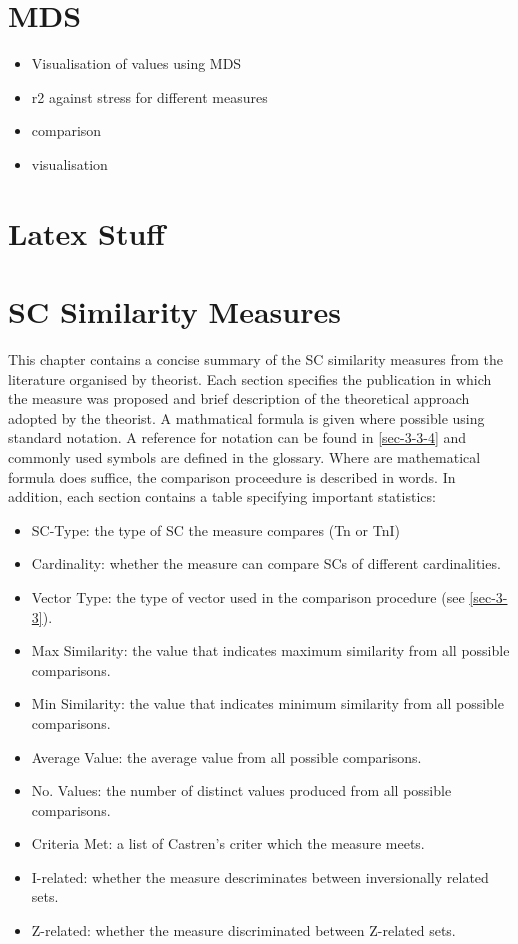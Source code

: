 \documentclass{article}
\begin{document}
\section{MDS}
\label{sec-9}

\begin{itemize}
\item Visualisation of values using MDS
\item r2 against stress for different measures
\item comparison
\item visualisation
\end{itemize}
\section{Latex Stuff}
\label{sec-10}

\clearpage



\clearpage
\appendix
\section{SC Similarity Measures}
\label{sec-11}

This chapter contains a concise summary of the SC similarity measures
from the literature organised by theorist. Each section specifies the
publication in which the measure was proposed and brief description of
the theoretical approach adopted by the theorist. A mathmatical
formula is given where possible using standard notation. A reference
for notation can be found in \ref{sec-3-3-4} and commonly used symbols are
defined in the glossary. Where are mathematical formula does suffice,
the comparison proceedure is described in words. In addition, each
section contains a table specifying important statistics:
\begin{itemize}
\item SC-Type: the type of SC the measure compares (Tn or TnI)
\item Cardinality: whether the measure can compare SCs of different
  cardinalities.
\item Vector Type: the type of vector used in the comparison procedure
  (see \ref{sec-3-3}).
\item Max Similarity: the value that indicates maximum similarity from all
  possible comparisons.
\item Min Similarity: the value that indicates minimum similarity from all
  possible comparisons.
\item Average Value: the average value from all possible comparisons.
\item No. Values: the number of distinct values produced from all possible
  comparisons.
\item Criteria Met: a list of Castren's criter which the measure meets.
\item I-related: whether the measure descriminates between inversionally
  related sets.
\item Z-related: whether the measure discriminated between Z-related sets.
\end{itemize}
\end{document}
